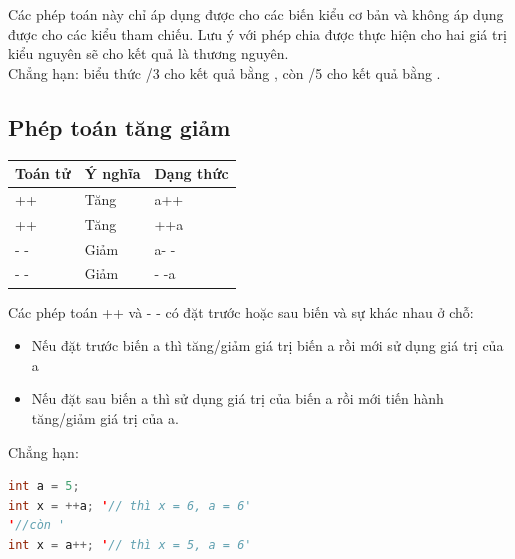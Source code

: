 \indent Các phép toán này chỉ áp dụng được cho các biến kiểu cơ bản và không áp dụng được cho các kiểu tham chiếu. Lưu ý với phép chia được thực hiện cho hai giá trị kiểu nguyên sẽ cho kết quả là thương nguyên.\\
\indent Chẳng hạn: biểu thức {/3} cho kết quả bằng {}, còn {/5} cho kết quả bằng {}.
\subsection{Phép toán tăng giảm}
\begin{center}
\centering
\begin{tabular}{ lll}
\hline
Toán tử&Ý nghĩa&Dạng thức\\
\hline
++ &Tăng&a++\\
\hline
++ &Tăng&++a\\
\hline
- - &Giảm&a- -\\
\hline
- - &Giảm&- -a\\
\hline
\end{tabular}
\end{center}
\indent Các phép toán ++ và - - có đặt trước hoặc sau biến và sự khác nhau ở chỗ:
\begin{itemize}
\item Nếu đặt trước biến a thì tăng/giảm giá trị biến a rồi mới sử dụng giá trị của a
\item Nếu đặt sau biến a thì sử dụng giá trị của biến a rồi mới tiến hành tăng/giảm giá trị của a.
\end{itemize}
\indent Chẳng hạn:\\
\begin{lstlisting}[escapechar=',language=java]	
int a = 5;
int x = ++a; '// thì x = 6, a = 6'
'//còn '
int x = a++; '// thì x = 5, a = 6'
\end{lstlisting}

